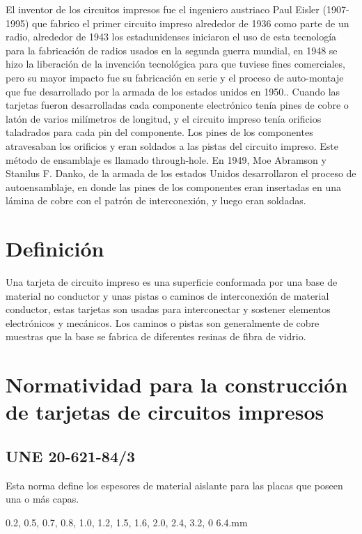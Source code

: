 \documentclass[a4paper,12pt,twoside]{proyectotanquesecci}
\begin{document}
El inventor de los circuitos impresos fue el ingeniero austriaco Paul Eisler (1907-1995) que fabrico el primer circuito impreso alrededor de 1936 como parte de un radio, alrededor  de 1943 los estadunidenses iniciaron el uso de esta tecnología para la fabricación de radios  usados en la segunda guerra mundial, en 1948 se hizo la liberación de la invención tecnológica para que tuviese fines comerciales, pero su mayor impacto fue su fabricación en serie y el proceso de auto-montaje  que fue desarrollado por la  armada de los estados unidos en  1950..
Cuando las tarjetas fueron desarrolladas cada componente electrónico tenía pines de cobre o latón de varios milímetros de longitud, y el circuito impreso tenía orificios taladrados para cada pin del componente. Los pines de los componentes atravesaban los orificios y eran soldados a las pistas del circuito impreso. Este método de ensamblaje es llamado through-hole.
En 1949, Moe Abramson y Stanilus F. Danko, de la armada de  los estados Unidos desarrollaron el proceso de autoensamblaje, en donde las pines de los componentes eran insertadas en una lámina de cobre con el patrón de interconexión, y luego eran soldadas.

\section{Definición}

Una tarjeta de circuito impreso es una superficie conformada por una base de material no conductor y unas pistas o caminos de interconexión de material conductor, estas tarjetas son usadas para interconectar y sostener elementos electrónicos y mecánicos.
Los caminos o pistas son generalmente  de cobre  muestras que la base se fabrica de diferentes resinas de fibra de vidrio.

\section{Normatividad para la construcción de  tarjetas de circuitos impresos}

\subsection{UNE  20-621-84/3}

Esta norma define  los espesores de material aislante para las placas que poseen una o más capas.

\begin{center}
0.2, 0.5, 0.7, 0.8, 1.0, 1.2, 1.5, 1.6, 2.0, 2.4, 3.2, 0 6.4.mm
\end{center}
\end{document}

